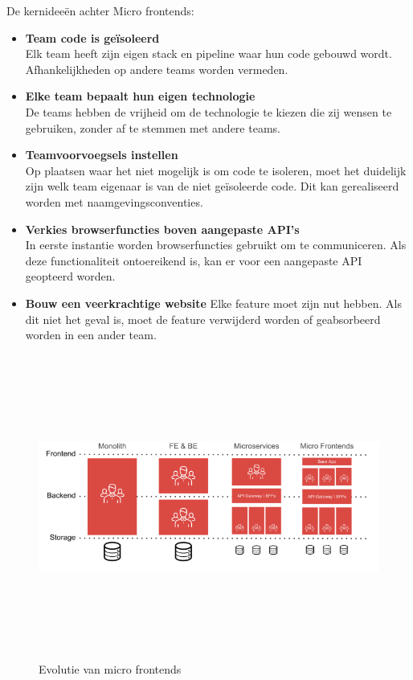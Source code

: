 De kernideeën achter Micro frontends:
\begin{itemize}
    \item \textbf{Team code is geïsoleerd} \\
          Elk team heeft zijn eigen stack en pipeline waar hun code gebouwd wordt. Afhankelijkheden op andere teams worden vermeden.
    \item \textbf{Elke team bepaalt hun eigen technologie} \\
          De teams hebben de vrijheid om de technologie te kiezen die zij wensen te gebruiken, zonder af te stemmen met andere teams. 
    \item \textbf{Teamvoorvoegsels instellen}\\
          Op plaatsen waar het niet mogelijk is om code te isoleren, moet het duidelijk zijn welk team eigenaar is van de niet geïsoleerde code. Dit kan gerealiseerd worden met naamgevingsconventies.  
    \item \textbf{Verkies browserfuncties boven aangepaste API’s}\\
          In eerste instantie worden browserfuncties gebruikt om te communiceren. Als deze functionaliteit ontoereikend is, kan er voor een aangepaste API geopteerd worden. 
    \item \textbf{Bouw een veerkrachtige website}
          Elke feature moet zijn nut hebben. Als dit niet het geval is, moet de feature verwijderd worden of geabsorbeerd worden in een ander team.\\
\end{itemize}
\begin{figure}[!htb]
    \centering
    \includegraphics[height=10cm, width=15cm]{MicroFrontendsVertical.png}
    \caption{Evolutie van micro frontends \label{microfrontends}}
\end{figure}

